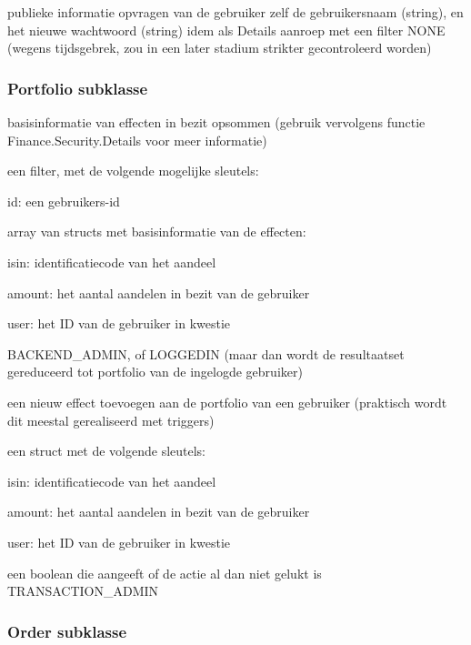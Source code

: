 	{ publieke informatie opvragen van de gebruiker zelf }
	{ de gebruikersnaam (string), en het nieuwe wachtwoord (string) }
	{ idem als Details aanroep met een filter }
	{ NONE (wegens tijdsgebrek, zou in een later stadium strikter gecontroleerd worden) }


\subsubsection{Portfolio subklasse}

	{ basisinformatie van effecten in bezit opsommen (gebruik vervolgens functie Finance.Security.Details voor meer informatie) }
	{ een filter, met de volgende mogelijke sleutels:
		\begin{itemize_compact}
		\item{id: een gebruikers-id}
		\end{itemize_compact} }
	{ array van structs met basisinformatie van de effecten:
		\begin{itemize_compact}
		\item{isin: identificatiecode van het aandeel}
		\item{amount: het aantal aandelen in bezit van de gebruiker}
		\item{user: het ID van de gebruiker in kwestie}
		\end{itemize_compact} }
	{ BACKEND\_ADMIN, of LOGGEDIN (maar dan wordt de resultaatset gereduceerd tot portfolio van de ingelogde gebruiker) }

	{ een nieuw effect toevoegen aan de portfolio van een gebruiker (praktisch wordt dit meestal gerealiseerd met triggers) }
	{ een struct met de volgende sleutels:
		\begin{itemize_compact}
		\item{isin: identificatiecode van het aandeel}
		\item{amount: het aantal aandelen in bezit van de gebruiker}
		\item{user: het ID van de gebruiker in kwestie}
		\end{itemize_compact} }
	{ een boolean die aangeeft of de actie al dan niet gelukt is }
	{ TRANSACTION\_ADMIN }


\subsubsection{Order subklasse}

